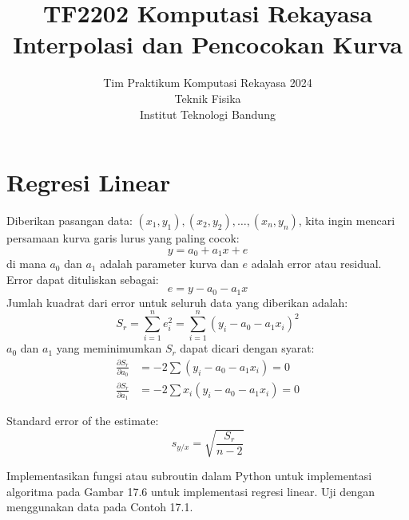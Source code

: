 



\title{%
{\small TF2202 Komputasi Rekayasa}\\
Interpolasi dan Pencocokan Kurva
}
\author{Tim Praktikum Komputasi Rekayasa 2024\\
Teknik Fisika\\
Institut Teknologi Bandung}
\date{}
\maketitle







\section{Regresi Linear}
Diberikan pasangan data: $(x_1, y_1), (x_2, y_2), \ldots, (x_n, y_n)$, kita ingin
mencari persamaan kurva garis lurus yang paling cocok:
\begin{equation}
y = a_0 + a_1 x + e
\end{equation}
di mana $a_0$ dan $a_1$ adalah parameter kurva dan $e$ adalah error atau residual.
Error dapat dituliskan sebagai:
\begin{equation}
e = y - a_0 - a_1 x
\end{equation}
Jumlah kuadrat dari error untuk seluruh data yang diberikan adalah:
\begin{equation}
S_r = \sum_{i=1}^{n} e_{i}^2 = \sum_{i=1}^{n} \left( y_{i} - a_0 - a_1 x_{i} \right)^2
\end{equation}
$a_0$ dan $a_1$ yang meminimumkan $S_r$ dapat dicari dengan syarat:
\begin{align}
\frac{\partial S_r}{\partial a_0} & = -2 \sum \left( y_i - a_0 - a_1 x_i \right) = 0 \\
\frac{\partial S_r}{\partial a_1} & = -2 \sum x_{i} \left( y_i - a_0 - a_1 x_i \right) = 0
\end{align}



Standard error of the estimate:
\begin{equation}
s_{y/x} = \sqrt{\frac{S_r}{n - 2}}
\end{equation}


\begin{soal}
Implementasikan fungsi atau subroutin dalam Python untuk implementasi algoritma
pada Gambar 17.6 untuk implementasi regresi linear. Uji dengan menggunakan data
pada Contoh 17.1.
\end{soal}

